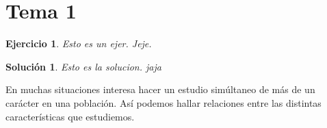 \documentclass[10pt, a4paper]{article}
\theoremstyle{theorem-style}
\theoremstyle{definition-style}
\theoremstyle{remark-style}
\theoremstyle{example-style}
\theoremstyle{definition-style}
\newtheorem{ejer}{Ejercicio}[section]
\theoremstyle{remark-style}
\newtheorem*{sol}{Solución}
\begin{document}
\pagebreak

\section{Tema 1}

\begin{ejer}
Esto es un ejer.
Jeje.
\end{ejer}
\begin{sol}
Esto es la solucion.
jaja
\end{sol}
En muchas situaciones interesa hacer un estudio simúltaneo de más de un
carácter en una población. Así podemos hallar relaciones entre las distintas
características que estudiemos.
\end{document}
